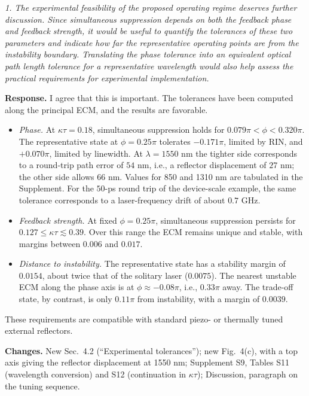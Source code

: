 \documentclass[11pt]{article}
\newenvironment{comment}{\par\medskip\noindent\begin{minipage}{\linewidth}\color{rc}\itshape}{\end{minipage}\par\smallskip}
\newcommand{\resp}{\noindent\textbf{Response.} }
\newcommand{\chg}{\par\noindent\textbf{Changes.} }
\begin{document}
\begin{comment}1. The experimental feasibility of the proposed operating regime deserves further discussion. Since simultaneous suppression depends on both the feedback phase and feedback strength, it would be useful to quantify the tolerances of these two parameters and indicate how far the representative operating points are from the instability boundary. Translating the phase tolerance into an equivalent optical path length tolerance for a representative wavelength would also help assess the practical requirements for experimental implementation.\end{comment}
\resp I agree that this is important. The tolerances have been computed along the principal ECM, and the results are favorable.
\begin{itemize}
\item \emph{Phase.} At $\kappa\tau=0.18$, simultaneous suppression holds for $0.079\pi<\phi<0.320\pi$. The representative state at $\phi=0.25\pi$ tolerates $-0.171\pi$, limited by RIN, and $+0.070\pi$, limited by linewidth. At $\lambda=1550$ nm the tighter side corresponds to a round-trip path error of $54$ nm, i.e., a reflector displacement of $27$ nm; the other side allows $66$ nm. Values for 850 and 1310 nm are tabulated in the Supplement. For the $50$-ps round trip of the device-scale example, the same tolerance corresponds to a laser-frequency drift of about $0.7$ GHz.
\item \emph{Feedback strength.} At fixed $\phi=0.25\pi$, simultaneous suppression persists for $0.127\le\kappa\tau\lesssim0.39$. Over this range the ECM remains unique and stable, with margins between $0.006$ and $0.017$.
\item \emph{Distance to instability.} The representative state has a stability margin of $0.0154$, about twice that of the solitary laser ($0.0075$). The nearest unstable ECM along the phase axis is at $\phi\approx-0.08\pi$, i.e., $0.33\pi$ away. The trade-off state, by contrast, is only $0.11\pi$ from instability, with a margin of $0.0039$.
\end{itemize}
These requirements are compatible with standard piezo- or thermally tuned external reflectors.
\chg New Sec.~4.2 (``Experimental tolerances''); new Fig.~4(c), with a top axis giving the reflector displacement at 1550 nm; Supplement S9, Tables S11 (wavelength conversion) and S12 (continuation in $\kappa\tau$); Discussion, paragraph on the tuning sequence.
\end{document}
